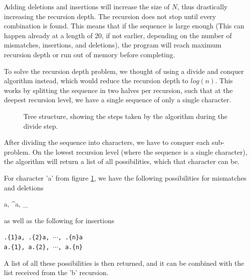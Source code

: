 \documentclass[12pt]{article}
\theoremstyle{definition}
\newcounter{subsubsubsection}[subsubsection]
\begin{document}
Adding deletions and insertions will increase the size of $N$, thus drastically increasing the recursion depth. The recursion does not stop until every combination is found. This means that if the sequence is large enough (This can happen already at a length of 20, if not earlier, depending on the number of mismatches, insertions, and deletions), the program will reach maximum recursion depth or run out of memory before completing.


To solve the recursion depth problem, we thought of using a divide and conquer algorithm instead, which would reduce the recursion depth to $log(n)$. This works by splitting the sequence in two halves per recursion, such that at the deepest recursion level, we have a single sequence of only a single character. 

\begin{figure}[H]
	\centering
	\caption{Tree structure, showing the steps taken by the algorithm during the divide step.}
	\label{fig:tree_example}
\end{figure}

After dividing the sequence into characters, we have to conquer each sub-problem. On the lowest recursion level (where the sequence is a single character), the algorithm will return a list of all possibilities, which that character can be.

For character 'a' from figure \ref{fig:tree_example}, we have the following possibilities for mismatches and deletions

\begin{center}
	{a, \^{}a, \_}
\end{center}

as well as the following for insertions

\begin{center}
	\texttt{.\{1\}a, .\{2\}a, $\cdots$, .\{n\}a} \\
	\texttt{a.\{1\}, a.\{2\}, $\cdots$, a.\{n\}}
\end{center}

A list of all these possibilities is then returned, and it can be combined with the list received from the 'b' recursion.
\end{document}
